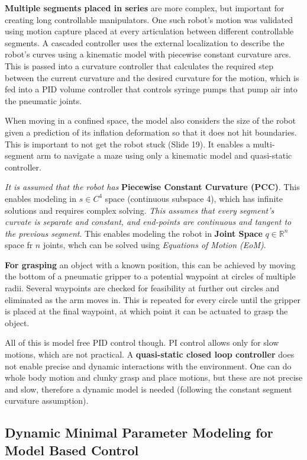 \documentclass[onecolumn,a4paper]{article}
\begin{document}
\textbf{Multiple segments placed in series} are more complex, but important for creating long controllable manipulators. One such robot's motion was validated using motion capture placed at every articulation between different controllable segments. A cascaded controller uses the external localization to describe the robot's curves using a kinematic model with piecewise constant curvature arcs. This is passed into a curvature controller that calculates the required step between the current curvature and the desired curvature for the motion, which is fed into a PID volume controller that controls syringe pumps that pump air into the pneumatic joints.

When moving in a confined space, the model also considers the size of the robot given a prediction of its inflation deformation so that it does not hit boundaries. This is important to not get the robot stuck (Slide 19). It enables a multi-segment arm to navigate a maze using only a kinematic model and quasi-static controller.

\emph{It is assumed that the robot has} \textbf{Piecewise Constant Curvature (PCC)}. This enables modeling in $s \in C^4$ space (continuous subspace 4), which has infinite solutions and requires complex solving. \emph{This assumes that every segment's curvate is separate and constant, and end-points are continuous and tangent to the previous segment}. This enables modeling the robot in \textbf{Joint Space} $q \in \mathbb{R}^n$ space fr $n$ joints, whch can be solved using \emph{Equations of Motion (EoM)}.

\textbf{For grasping} an object with a known position, this can be achieved by moving the bottom of a pneumatic gripper to a potential waypoint at circles of multiple radii. Several waypoints are checked for feasibility at further out circles and eliminated as the arm moves in. This is repeated for every circle until the gripper is placed at the final waypoint, at which point it can be actuated to grasp the object.

All of this is model free PID control though. PI control allows only for slow motions, which are not practical. A \textbf{quasi-static closed loop controller} does not enable precise and dynamic interactions with the environment. One can do whole body motion and clunky grasp and place motions, but these are not precise and slow, therefore a dynamic model is needed (following the constant segment curvature assumption).

\subsection{Dynamic Minimal Parameter Modeling for Model Based Control}
\end{document}
